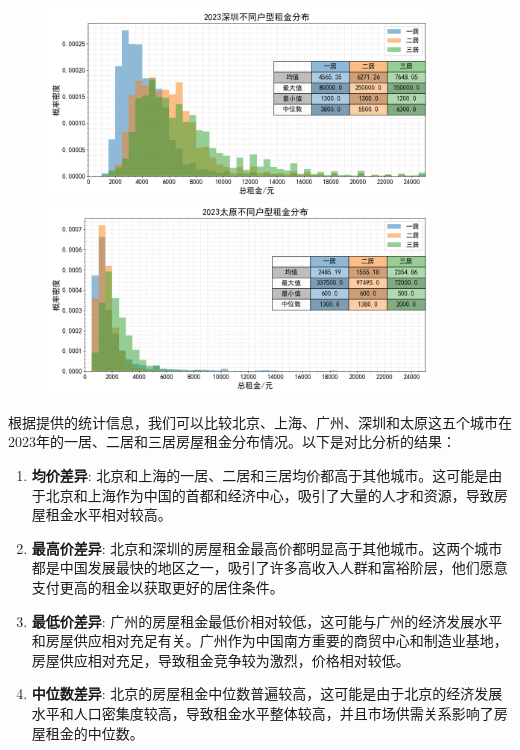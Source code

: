 \documentclass[lang=cn,11pt,a4paper]{elegantpaper}
\begin{document}
\begin{figure}[H]
    \centering
    \includegraphics[width=0.9\textwidth]{image/2023深圳不同户型租金分布.png}
    \includegraphics[width=0.9\textwidth]{image/2023太原不同户型租金分布.png}
\end{figure}

根据提供的统计信息，我们可以比较北京、上海、广州、深圳和太原这五个城市在2023年的一居、二居和三居房屋租金分布情况。以下是对比分析的结果：

\begin{enumerate}
    \item \textbf{均价差异}: 北京和上海的一居、二居和三居均价都高于其他城市。这可能是由于北京和上海作为中国的首都和经济中心，吸引了大量的人才和资源，导致房屋租金水平相对较高。
    \item \textbf{最高价差异}: 北京和深圳的房屋租金最高价都明显高于其他城市。这两个城市都是中国发展最快的地区之一，吸引了许多高收入人群和富裕阶层，他们愿意支付更高的租金以获取更好的居住条件。
    \item \textbf{最低价差异}: 广州的房屋租金最低价相对较低，这可能与广州的经济发展水平和房屋供应相对充足有关。广州作为中国南方重要的商贸中心和制造业基地，房屋供应相对充足，导致租金竞争较为激烈，价格相对较低。
    \item \textbf{中位数差异}: 北京的房屋租金中位数普遍较高，这可能是由于北京的经济发展水平和人口密集度较高，导致租金水平整体较高，并且市场供需关系影响了房屋租金的中位数。
\end{enumerate}
\end{document}
